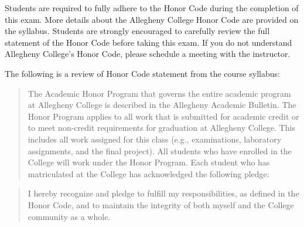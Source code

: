 \documentclass[11pt]{article}
\begin{document}
\noindent Students are required to fully adhere to the Honor Code during the
completion of this exam. More details about the Allegheny College Honor Code are
provided on the syllabus. Students are strongly encouraged to carefully review
the full statement of the Honor Code before taking this exam. If you do not
understand Allegheny College's Honor Code, please schedule a meeting with the
instructor.

The following is a review of Honor Code statement from the course
syllabus:

\begin{quote}
  The Academic Honor Program that governs the entire academic program at
  Allegheny College is described in the Allegheny Academic Bulletin. The Honor
  Program applies to all work that is submitted for academic credit or to meet
  non-credit requirements for graduation at Allegheny College. This includes all
  work assigned for this class (e.g., examinations, laboratory assignments, and
  the final project). All students who have enrolled in the College will work
  under the Honor Program. Each student who has matriculated at the College has
  acknowledged the following pledge:
\end{quote}

\begin{quote}
  I hereby recognize and pledge to fulfill my responsibilities, as defined in
  the Honor Code, and to maintain the integrity of both myself and the College
  community as a whole.
\end{quote}
\end{document}
